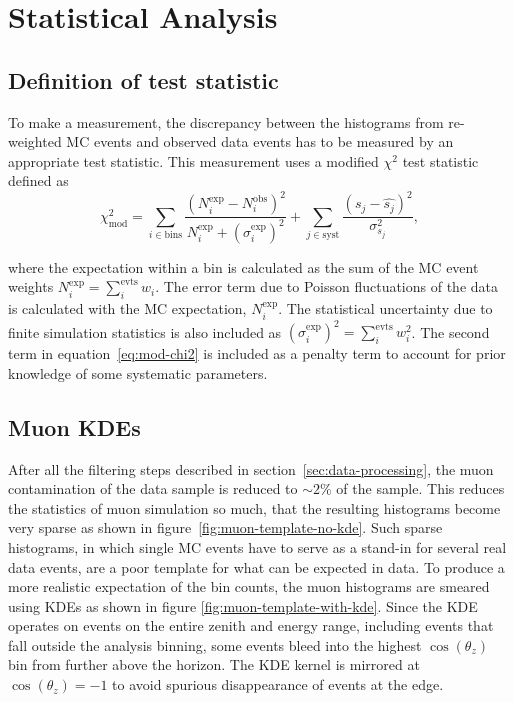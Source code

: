 \section{Statistical Analysis}

\subsection{Definition of test statistic}
\label{sec:test-statistic}

To make a measurement, the discrepancy between the histograms from re-weighted MC events and observed data events has to be measured by an appropriate test statistic. This measurement uses a modified $\chi^2$ test statistic defined as
\begin{equation}
\chi^2_{\mathrm{mod}} = \sum_{i \in \mathrm{bins}}^{}\frac{(N^{\mathrm{exp}}_i - N^{\mathrm{obs}}_i)^2}{N^{\mathrm{exp}}_i + (\sigma^{\mathrm{exp}}_i)^2} + \sum_{j \in \mathrm{syst}}^{}\frac{(s_j - \hat{s_j})^2}{\sigma^2_{s_j}},
\label{eq:mod-chi2}
\end{equation}

\noindent where the expectation within a bin is calculated as the sum of the MC event weights $N^{\mathrm{exp}}_i = \sum_{i}^{\mathrm{evts}} w_i$. The error term due to Poisson fluctuations of the data is calculated with the MC expectation, $N^{\mathrm{exp}}_i$. The statistical uncertainty due to finite simulation statistics is also included as $(\sigma^{\mathrm{exp}}_i)^2 = \sum_{i}^{\mathrm{evts}} w_i^2$. The second term in equation~\ref{eq:mod-chi2} is included as a penalty term to account for prior knowledge of some systematic parameters. 

\subsection{Muon KDEs}
\label{section:muon_kde}

After all the filtering steps described in section~\ref{sec:data-processing}, the muon contamination of the data sample is reduced to $\sim 2\%$ of the sample. This reduces the statistics of muon simulation so much, that the resulting histograms become very sparse as shown in figure~\ref{fig:muon-template-no-kde}. Such sparse histograms, in which single MC events have to serve as a stand-in for several real data events, are a poor template for what can be expected in data. To produce a more realistic expectation of the bin counts, the muon histograms are smeared using KDEs as shown in figure \ref{fig:muon-template-with-kde}. Since the KDE operates on events on the entire zenith and energy range, including events that fall outside the analysis binning, some events bleed into the highest $\cos(\theta_z)$ bin from further above the horizon. The KDE kernel is mirrored at $\cos(\theta_z) = -1$ to avoid spurious disappearance of events at the edge.

